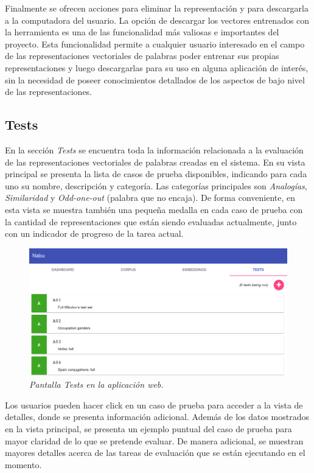 Finalmente se ofrecen acciones para eliminar la representación y para descargarla a la computadora del usuario.
La opción de descargar los vectores entrenados con la herramienta es una de las funcionalidad más valiosas e
importantes del proyecto. Esta funcionalidad permite a cualquier usuario interesado en el campo de las
representaciones vectoriales de palabras poder entrenar sus propias representaciones y luego descargarlas para
su uso en alguna aplicación de interés, sin la necesidad de poseer conocimientos detallados de los aspectos de
bajo nivel de las representaciones.

\subsection{Tests}

En la sección \textit{Tests} se encuentra toda la información relacionada a la evaluación de las
representaciones vectoriales de palabras creadas en el sistema. En su vista principal se presenta la lista de
casos de prueba disponibles, indicando para cada uno su nombre, descripción y categoría. Las categorías
principales son \textit{Analogías}, \textit{Similaridad} y \textit{Odd-one-out} (palabra que no encaja). De
forma conveniente, en esta vista se muestra también una pequeña medalla en cada caso de prueba con la cantidad
de representaciones que están siendo evaluadas actualmente, junto con un indicador de progreso de la tarea
actual.

\begin{figure}[h]
    \centering
    \includegraphics[width=\textwidth]{images/ui-nabu-tests}
    \caption{\textit{Pantalla Tests en la aplicación web.}}
    \label{fig:ui-nabu-tests}
\end{figure}

Los usuarios pueden hacer click en un caso de prueba para acceder a la vista de detalles, donde se
presenta información adicional. Además de los datos mostrados en la vista principal, se presenta un
ejemplo puntual del caso de prueba para mayor claridad de lo que se pretende evaluar. De manera adicional,
se muestran mayores detalles acerca de las tareas de evaluación que se están ejecutando en el momento.

